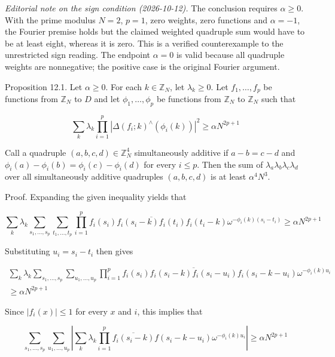 \documentclass[10pt]{article}
\begin{document}
\emph{Editorial note on the sign condition (2026-10-12).}
The conclusion requires $\alpha\geqslant0$. With the prime modulus $N=2$, $p=1$, zero weights,
zero functions and $\alpha=-1$, the Fourier premise holds but the claimed
weighted quadruple sum would have to be at least eight, whereas it is zero.
This is a verified counterexample to the unrestricted sign reading.
The endpoint $\alpha=0$ is valid because all quadruple weights are
nonnegative; the positive case is the original Fourier argument.

Proposition 12.1. Let $\alpha\geqslant0$. For each $k \in \mathbb{Z}_{N}$, let $\lambda_{k} \geqslant 0$. Let $f_{1}, \ldots, f_{p}$ be functions from $\mathbb{Z}_{N}$ to $D$ and let $\phi_{1}, \ldots, \phi_{p}$ be functions from $\mathbb{Z}_{N}$ to $\mathbb{Z}_{N}$ such that

$$
\sum_{k} \lambda_{k} \prod_{i=1}^{p}\left|\Delta\left(f_{i} ; k\right)^{\wedge}\left(\phi_{i}(k)\right)\right|^{2} \geqslant \alpha N^{2 p+1}
$$

Call a quadruple $(a, b, c, d) \in \mathbb{Z}_{N}^{4}$ simultaneously additive if $a-b=c-d$ and $\phi_{i}(a)-\phi_{i}(b)=\phi_{i}(c)-\phi_{i}(d)$ for every $i \leqslant p$. Then the sum of $\lambda_{a} \lambda_{b} \lambda_{c} \lambda_{d}$ over all simultaneously additive quadruples $(a, b, c, d)$ is at least $\alpha^{4} N^{3}$.

Proof. Expanding the given inequality yields that

$$
\sum_{k} \lambda_{k} \sum_{s_{1}, \ldots, s_{p}} \sum_{t_{1}, \ldots, t_{p}} \prod_{i=1}^{p} f_{i}\left(s_{i}\right) \overline{f_{i}\left(s_{i}-k\right) f_{i}\left(t_{i}\right)} f_{i}\left(t_{i}-k\right) \omega^{-\phi_{i}(k)\left(s_{i}-t_{i}\right)} \geqslant \alpha N^{2 p+1}
$$

Substituting $u_{i}=s_{i}-t_{i}$ then gives

$$
\begin{array}{r}
\sum_{k} \lambda_{k} \sum_{s_{1}, \ldots, s_{p}} \sum_{u_{1}, \ldots, u_{p}} \prod_{i=1}^{p} f_{i}\left(s_{i}\right) \overline{f_{i}\left(s_{i}-k\right) f_{i}\left(s_{i}-u_{i}\right)} f_{i}\left(s_{i}-k-u_{i}\right) \omega^{-\phi_{i}(k) u_{i}} \\
\geqslant \alpha N^{2 p+1}
\end{array}
$$

Since $\left|f_{i}(x)\right| \leqslant 1$ for every $x$ and $i$, this implies that

$$
\sum_{s_{1}, \ldots, s_{p}} \sum_{u_{1}, \ldots, u_{p}}\left|\sum_{k} \lambda_{k} \prod_{i=1}^{p} \overline{f_{i}\left(s_{i}-k\right)} f\left(s_{i}-k-u_{i}\right) \omega^{-\phi_{i}(k) u_{i}}\right| \geqslant \alpha N^{2 p+1}
$$
\end{document}
